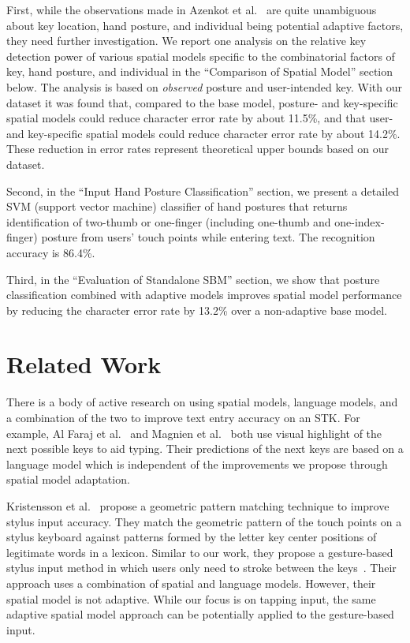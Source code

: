 \documentclass{sigchi}
\begin{document}
First, while the observations made in Azenkot et al.~\cite{Azenkot:2012} are quite unambiguous
about key location, hand posture, and individual being potential adaptive
factors, they need further investigation.  We report one analysis on the
relative key detection power of various spatial models specific to the
combinatorial factors of key, hand posture, and individual in the ``Comparison of Spatial Model'' section below. The analysis is based on \textit{observed}
posture and user-intended key. With our dataset it was found that, compared to
the base model, posture- and key-specific spatial models could reduce character
error rate by about 11.5\%, and that user- and key-specific spatial models could
reduce character error rate by about 14.2\%. These reduction in error rates
represent theoretical upper bounds based on our dataset.

Second, in the ``Input Hand Posture Classification'' section, we present a detailed
SVM (support vector machine) classifier of hand postures that returns identification of
two-thumb or one-finger (including one-thumb and one-index-finger) posture from users' touch points while entering text. The recognition accuracy is 86.4\%.

Third, in the ``Evaluation of Standalone SBM'' section, we show that posture classification combined with adaptive models improves spatial model performance by reducing the character error rate by 13.2\% over a non-adaptive base model.

\section{Related Work}

There is a body of active research on using spatial models, language models, and a combination
of the two to improve text entry accuracy on an STK. For example,
Al Faraj et al.~\cite{AlFaraj:2009} and Magnien et al.~\cite{Magnien:2004} both use
visual highlight of the next possible keys to aid typing. Their predictions of the next keys are based on a language model which is independent of the improvements we propose through spatial model adaptation.

Kristensson et al.~\cite{Kristensson:2005} propose a geometric pattern matching technique to improve
stylus input accuracy. They match the geometric pattern of the touch points on a stylus keyboard against patterns formed by
the letter key center positions of legitimate words in a lexicon. Similar to our work,
they propose a gesture-based stylus input method in which users only need to stroke between the keys~\cite{Kristensson:2004}.
Their approach uses a combination of spatial and language models. However,
their spatial model is not adaptive. While our focus is on tapping input, the same adaptive spatial model approach
can be potentially applied to the gesture-based input.
\end{document}
